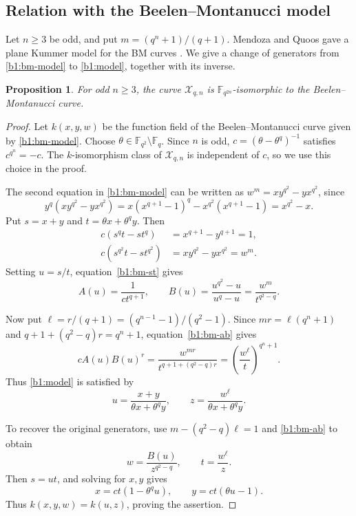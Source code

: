 \documentclass[10pt,a4paper]{amsart}
\numberwithin{equation}{section}
\newcommand{\F}{\mathbb F}
\newtheorem{proposition}[theorem]{Proposition}
\begin{document}
\subsection{Relation with the Beelen--Montanucci model}

Let \(n\ge3\) be odd, and put \(m=(q^n+1)/(q+1)\).
Mendoza and Quoos gave a plane Kummer model for the BM curves
\cite[Corollary~3.3]{MQ2022}.
We give a change of generators from \eqref{b1:bm-model} to
\eqref{b1:model}, together with its inverse.

\begin{proposition}
\label{b1:bm-identification}
For odd \(n\ge3\), the curve \(\mathcal X_{q,n}\) is
\(\F_{q^{2n}}\)-isomorphic to the Beelen--Montanucci curve.
\end{proposition}

\begin{proof}
Let \(k(x,y,w)\) be the function field of the Beelen--Montanucci
curve given by \eqref{b1:bm-model}.
Choose \(\theta\in\F_{q^2}\setminus\F_q\). Since \(n\) is odd,
\(c=(\theta-\theta^q)^{-1}\) satisfies \(c^{q^n}=-c\).
The \(k\)-isomorphism class of \(\mathcal X_{q,n}\) is independent
of \(c\), so we use this choice in the proof.

The second equation in \eqref{b1:bm-model} can be written as
\(w^m=xy^{q^2}-yx^{q^2}\), since
\[
 y^q(xy^{q^2}-yx^{q^2})
 =x(x^{q+1}-1)^q-x^{q^2}(x^{q+1}-1)
 =x^{q^2}-x.
\]
Put \(s=x+y\) and \(t=\theta x+\theta^qy\). Then
\begin{equation}
\label{b1:bm-st}
 \begin{aligned}
 c(s^qt-st^q)&=x^{q+1}-y^{q+1}=1,\\
 c(s^{q^2}t-st^{q^2})&=xy^{q^2}-yx^{q^2}=w^m.
 \end{aligned}
\end{equation}
Setting \(u=s/t\), equation~\eqref{b1:bm-st} gives
\begin{equation}
\label{b1:bm-ab}
 A(u)=\frac{1}{ct^{q+1}},\qquad
 B(u)=\frac{u^{q^2}-u}{u^q-u}=\frac{w^m}{t^{q^2-q}}.
\end{equation}

Now put \(\ell=r/(q+1)=(q^{n-1}-1)/(q^2-1)\).
Since \(mr=\ell(q^n+1)\) and
\(q+1+(q^2-q)r=q^n+1\), equation~\eqref{b1:bm-ab} gives
\[
 cA(u)B(u)^r
 =\frac{w^{mr}}{t^{q+1+(q^2-q)r}}
 =\left(\frac{w^\ell}{t}\right)^{q^n+1}.
\]
Thus \eqref{b1:model} is satisfied by
\begin{equation}
\label{b1:bm-change}
 u=\frac{x+y}{\theta x+\theta^qy},\qquad
 z=\frac{w^\ell}{\theta x+\theta^qy}.
\end{equation}

To recover the original generators, use
\(m-(q^2-q)\ell=1\) and \eqref{b1:bm-ab} to obtain
\[
 w=\frac{B(u)}{z^{q^2-q}},\qquad t=\frac{w^\ell}{z}.
\]
Then \(s=ut\), and solving for \(x,y\) gives
\[
 x=ct(1-\theta^qu),\qquad y=ct(\theta u-1).
\]
Thus \(k(x,y,w)=k(u,z)\), proving the assertion.
\end{proof}
\end{document}
